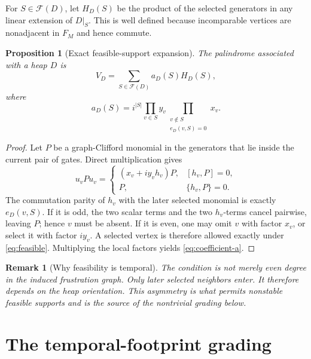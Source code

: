 \documentclass[10pt,letterpaper]{article}
\newtheorem{proposition}[theorem]{Proposition}
\newtheorem{remark}[theorem]{Remark}
\newcommand{\Ffam}{\mathcal F}
\begin{document}
For \(S\in\Ffam(D)\), let \(H_D(S)\) be the product of the selected generators in any linear extension of \(D|_S\).  This is well defined because incomparable vertices are nonadjacent in \(F_M\) and hence commute.

\begin{proposition}[Exact feasible-support expansion]\label{prop:exact-expansion}
The palindrome associated with a heap \(D\) is
\begin{equation}\label{eq:exact-expansion}
 V_D=\sum_{S\in\Ffam(D)}a_D(S)H_D(S),
\end{equation}
where
\begin{equation}\label{eq:coefficient-a}
 a_D(S)=i^{|S|}
 \prod_{v\in S}y_v
 \prod_{\substack{v\notin S\\ e_D(v,S)=0}}x_v.
\end{equation}
\end{proposition}

\begin{proof}
Let \(P\) be a graph-Clifford monomial in the generators that lie inside the current pair of gates.  Direct multiplication gives
\begin{equation}\label{eq:peel}
 u_vPu_v=
 \begin{cases}
 (x_v+i y_vh_v)P,&[h_v,P]=0,\\
 P,&\{h_v,P\}=0.
 \end{cases}
\end{equation}
The commutation parity of \(h_v\) with the later selected monomial is exactly \(e_D(v,S)\).  If it is odd, the two scalar terms and the two \(h_v\)-terms cancel pairwise, leaving \(P\); hence \(v\) must be absent.  If it is even, one may omit \(v\) with factor \(x_v\), or select it with factor \(iy_v\).  A selected vertex is therefore allowed exactly under \eqref{eq:feasible}.  Multiplying the local factors yields \eqref{eq:coefficient-a}.
\end{proof}

\begin{remark}[Why feasibility is temporal]
The condition is not merely even degree in the induced frustration graph.  Only later selected neighbors enter.  It therefore depends on the heap orientation.  This asymmetry is what permits nonstable feasible supports and is the source of the nontrivial grading below.
\end{remark}

\section{The temporal-footprint grading}\label{sec:grading}
\end{document}
